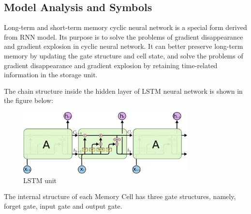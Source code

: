 \documentclass{swmcmthesis}
\begin{document}
\subsection{Model Analysis and Symbols}
\hspace{1.25em}
Long-term and short-term memory cyclic neural network is a special form derived from RNN model. Its purpose is to solve the problems of gradient disappearance and gradient explosion in cyclic neural network. It can better preserve long-term memory by updating the gate structure and cell state, and solve the problems of gradient disappearance and gradient explosion by retaining time-related information in the storage unit.
\par
The chain structure inside the hidden layer of LSTM neural network is shown in the figure below:
\begin{figure}[h!t]
    \centering
    \includegraphics[width=0.8\textwidth]{LSTM_unit.jpg}
    \caption{LSTM unit}
\end{figure}
\par 
The internal structure of each Memory Cell has three gate structures, namely, forget gate, input gate and output gate.
\end{document}
